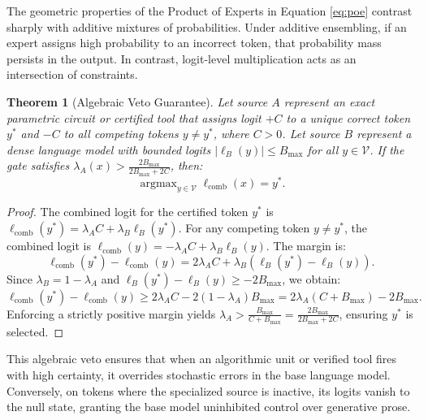 \documentclass[preprint,12pt]{elsarticle}
\newtheorem{theorem}{Theorem}
\begin{document}
The geometric properties of the Product of Experts in Equation \eqref{eq:poe} contrast sharply with additive mixtures of probabilities. Under additive ensembling, if an expert assigns high probability to an incorrect token, that probability mass persists in the output. In contrast, logit-level multiplication acts as an intersection of constraints.

\begin{theorem}[Algebraic Veto Guarantee]
Let source $A$ represent an exact parametric circuit or certified tool that assigns logit $+C$ to a unique correct token $y^*$ and $-C$ to all competing tokens $y \neq y^*$, where $C > 0$. Let source $B$ represent a dense language model with bounded logits $|\ell_B(y)| \le B_{\max}$ for all $y \in \mathcal{V}$. If the gate satisfies $\lambda_A(x) > \frac{2 B_{\max}}{2 B_{\max} + 2 C}$, then:
\begin{equation}
\operatorname{argmax}_{y \in \mathcal{V}} \ell_{\mathrm{comb}}(x) = y^*.
\end{equation}
\end{theorem}

\begin{proof}
The combined logit for the certified token $y^*$ is $\ell_{\mathrm{comb}}(y^*) = \lambda_A C + \lambda_B \ell_B(y^*)$. For any competing token $y \neq y^*$, the combined logit is $\ell_{\mathrm{comb}}(y) = -\lambda_A C + \lambda_B \ell_B(y)$. The margin is:
\begin{equation}
\ell_{\mathrm{comb}}(y^*) - \ell_{\mathrm{comb}}(y) = 2 \lambda_A C + \lambda_B (\ell_B(y^*) - \ell_B(y)).
\end{equation}
Since $\lambda_B = 1 - \lambda_A$ and $\ell_B(y^*) - \ell_B(y) \ge -2 B_{\max}$, we obtain:
\begin{equation}
\ell_{\mathrm{comb}}(y^*) - \ell_{\mathrm{comb}}(y) \ge 2 \lambda_A C - 2(1 - \lambda_A) B_{\max} = 2 \lambda_A (C + B_{\max}) - 2 B_{\max}.
\end{equation}
Enforcing a strictly positive margin yields $\lambda_A > \frac{B_{\max}}{C + B_{\max}} = \frac{2 B_{\max}}{2 B_{\max} + 2 C}$, ensuring $y^*$ is selected.
\end{proof}

This algebraic veto ensures that when an algorithmic unit or verified tool fires with high certainty, it overrides stochastic errors in the base language model. Conversely, on tokens where the specialized source is inactive, its logits vanish to the null state, granting the base model uninhibited control over generative prose.
\end{document}
